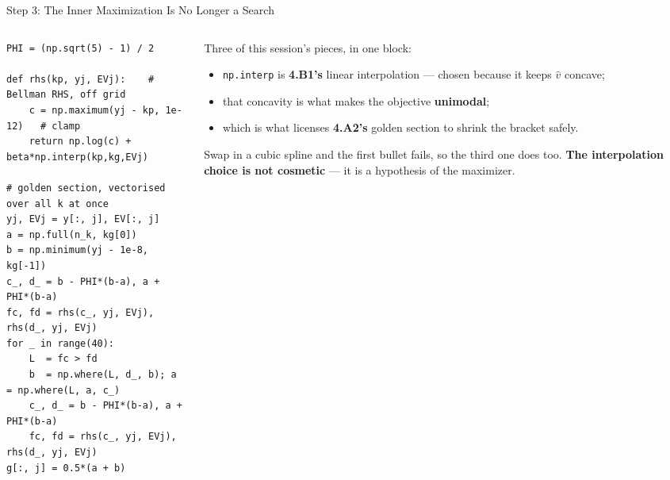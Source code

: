 \begin{frame}[fragile]{Step 3: The Inner Maximization Is No Longer a Search}
\begin{columns}[T]
\begin{column}{0.55\textwidth}
\begin{lstlisting}
PHI = (np.sqrt(5) - 1) / 2

def rhs(kp, yj, EVj):    # Bellman RHS, off grid
    c = np.maximum(yj - kp, 1e-12)   # clamp
    return np.log(c) + beta*np.interp(kp,kg,EVj)

# golden section, vectorised over all k at once
yj, EVj = y[:, j], EV[:, j]
a = np.full(n_k, kg[0])
b = np.minimum(yj - 1e-8, kg[-1])
c_, d_ = b - PHI*(b-a), a + PHI*(b-a)
fc, fd = rhs(c_, yj, EVj), rhs(d_, yj, EVj)
for _ in range(40):
    L  = fc > fd
    b  = np.where(L, d_, b); a = np.where(L, a, c_)
    c_, d_ = b - PHI*(b-a), a + PHI*(b-a)
    fc, fd = rhs(c_, yj, EVj), rhs(d_, yj, EVj)
g[:, j] = 0.5*(a + b)
\end{lstlisting}
\end{column}
\begin{column}{0.42\textwidth}
\small
Three of this session's pieces, in one block:
\medskip
\begin{itemize}\footnotesize
  \item \texttt{np.interp} is \textbf{4.B1's} linear interpolation --- chosen because it keeps $\hat v$ concave;
  \item that concavity is what makes the objective \textbf{unimodal};
  \item which is what licenses \textbf{4.A2's} golden section to shrink the bracket safely.
\end{itemize}
\medskip
\begin{cautionbox}\footnotesize
Swap in a cubic spline and the first bullet fails, so the third one does too. \textbf{The interpolation choice is not cosmetic} --- it is a hypothesis of the maximizer.
\end{cautionbox}
\end{column}
\end{columns}
\end{frame}

